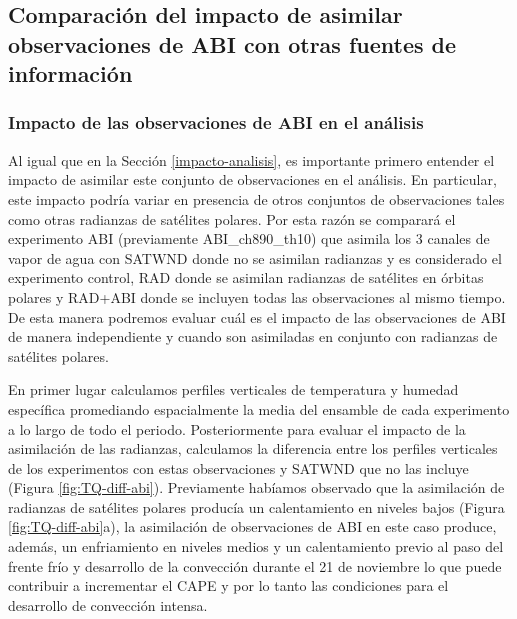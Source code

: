 \documentclass[12pt,oneside,a4paper]{reedthesis}
\begin{document}
\hypertarget{comparaciuxf3n-del-impacto-de-asimilar-observaciones-de-abi-con-otras-fuentes-de-informaciuxf3n}{%
\subsection{Comparación del impacto de asimilar observaciones de ABI con otras fuentes de información}\label{comparaciuxf3n-del-impacto-de-asimilar-observaciones-de-abi-con-otras-fuentes-de-informaciuxf3n}}

\hypertarget{impacto-de-las-observaciones-de-abi-en-el-anuxe1lisis}{%
\subsubsection{Impacto de las observaciones de ABI en el análisis}\label{impacto-de-las-observaciones-de-abi-en-el-anuxe1lisis}}

Al igual que en la Sección \ref{impacto-analisis}, es importante primero entender el impacto de asimilar este conjunto de observaciones en el análisis. En particular, este impacto podría variar en presencia de otros conjuntos de observaciones tales como otras radianzas de satélites polares. Por esta razón se comparará el experimento ABI (previamente ABI\_ch890\_th10) que asimila los 3 canales de vapor de agua con SATWND donde no se asimilan radianzas y es considerado el experimento control, RAD donde se asimilan radianzas de satélites en órbitas polares y RAD+ABI donde se incluyen todas las observaciones al mismo tiempo. De esta manera podremos evaluar cuál es el impacto de las observaciones de ABI de manera independiente y cuando son asimiladas en conjunto con radianzas de satélites polares.

En primer lugar calculamos perfiles verticales de temperatura y humedad específica promediando espacialmente la media del ensamble de cada experimento a lo largo de todo el periodo. Posteriormente para evaluar el impacto de la asimilación de las radianzas, calculamos la diferencia entre los perfiles verticales de los experimentos con estas observaciones y SATWND que no las incluye (Figura \ref{fig:TQ-diff-abi}). Previamente habíamos observado que la asimilación de radianzas de satélites polares producía un calentamiento en niveles bajos (Figura \ref{fig:TQ-diff-abi}a), la asimilación de observaciones de ABI en este caso produce, además, un enfriamiento en niveles medios y un calentamiento previo al paso del frente frío y desarrollo de la convección durante el 21 de noviembre lo que puede contribuir a incrementar el CAPE y por lo tanto las condiciones para el desarrollo de convección intensa.
\end{document}
